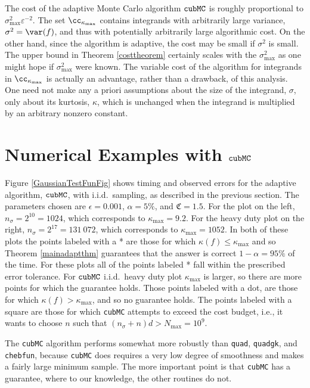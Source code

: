 \documentclass[graybox]{svmult}
\newcommand{\fudge}{\mathfrak{C}}
\newcommand{\aMC}{{\tt cubMC}\xspace}
\begin{document}
The cost of the adaptive Monte Carlo algorithm $\aMC$ is roughly proportional to $\sigma^2_{\max}\varepsilon^{-2}$.  The set $\cc_{\kappa_{\max}}$ contains integrands with arbitrarily large variance, $\sigma^2=\var(f)$, and thus with potentially arbitrarily large algorithmic cost.  On the other hand, since the algorithm is adaptive, the cost may be small if $\sigma^2$ is small.  The upper bound in Theorem \ref{costtheorem} certainly scales with the $\sigma^2_{\max}$ as one might hope if $\sigma^2_{\max}$ were known.  The variable cost of the algorithm for integrands in $\cc_{\kappa_{\max}}$ is actually an advantage, rather than a drawback, of this analysis.  One need not make any a priori assumptions about the size of the integrand, $\sigma$, only about its kurtosis, $\kappa$, which is unchanged when the integrand is multiplied by an arbitrary nonzero constant.

\section{Numerical Examples with $\aMC$} \label{numerexsec}

Figure \ref{GaussianTestFunFig} shows timing and observed errors for the adaptive algorithm, $\aMC$, with i.i.d.\ sampling, as described in the previous section.  The parameters chosen are $\epsilon=0.001$, $\alpha=5\%$, and  $\fudge=1.5$.  For the plot on the left, $n_\sigma=2^{10}=1024$, which corresponds to  $\kappa_{\max}=9.2$.  For the heavy duty plot on the right, $n_\sigma=2^{17}=131\ 072$, which corresponds to  $\kappa_{\max}=1052$. In both of these plots the points labeled with a * are those for which $\kappa(f) \le \kappa_{\max}$ and so Theorem \ref{mainadaptthm} guarantees that the answer is correct $1-\alpha= 95\%$ of the time.  For these plots all of the points labeled * fall within the prescribed error tolerance.  For $\aMC$ i.i.d.\ heavy duty plot $\kappa_{\max}$ is larger, so there are more points for which the guarantee holds.  Those points labeled with a dot, are those for which $\kappa(f) > \kappa_{\max}$, and so no guarantee holds. The points labeled with a square are those for which \aMC attempts to exceed the cost budget, i.e., it wants to choose $n$ such that $(n_{\sigma}+n)d > N_{\max}=10^9$. 

The {\tt cubMC} algorithm performs somewhat more robustly than {\tt quad}, {\tt quadgk}, and {\tt chebfun}, because \aMC does requires a very low degree of smoothness and makes a fairly large minimum sample.  The more important point is that \aMC has a guarantee, where to our knowledge, the other routines do not.
\end{document}
